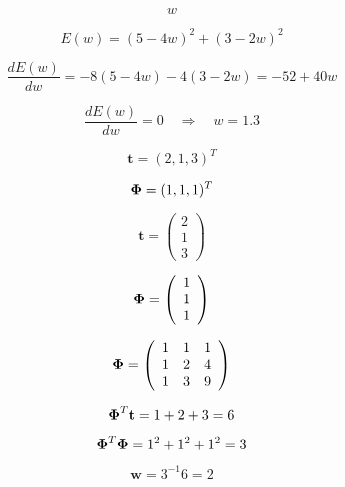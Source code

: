 \documentclass[10pt,twoside]{book}
\newcommand{\bldgr}[1]{{\mbox{\boldmath {${#1}$}}}} %
\newcommand{\fat}[1]{\mathbf{#1}} %
\newcommand{\transp}{^T} %
\begin{document}
$$
w
$$

$$
E(w) = (5 - 4 w )^2 + (3 - 2 w )^2
$$

$$
\frac{ d E(w) }{ d w}
= 
-8 (5 - 4 w ) - 4 (3 - 2 w )
= 
-52 + 40 w
$$

$$
\frac{ d E(w) }{ d w}
= 0
\quad
\Rightarrow
\quad
w = 1.3
$$


$$
  \fat{t} = (2, 1, 3 )\transp
$$

$$
  \bldgr{\Phi} = ( 1, 1, 1 )\transp
$$


$$
  \fat{t} = \left(
               \begin{array}{c}
                 2 \\
                 1 \\
                 3
               \end{array}
             \right)
$$

$$
             \bldgr{\Phi} = \left(
               \begin{array}{c}
                 1 \\
                 1 \\
                 1
               \end{array}
             \right)
$$

$$
  \bldgr{\Phi} = \left(
               \begin{array}{ccc}
                 1 & 1 & 1\\
                 1 & 2 & 4 \\
                 1 & 3 & 9
               \end{array}
             \right)
$$

$$
\bldgr{\Phi}\transp \fat{t} = 1 + 2 + 3 = 6
$$ 

$$
\bldgr{\Phi}\transp\bldgr{\Phi} = 1^2 + 1^2 + 1^2 = 3
$$

$$
\fat{w} = 3^{-1} 6 = 2
$$
\end{document}
